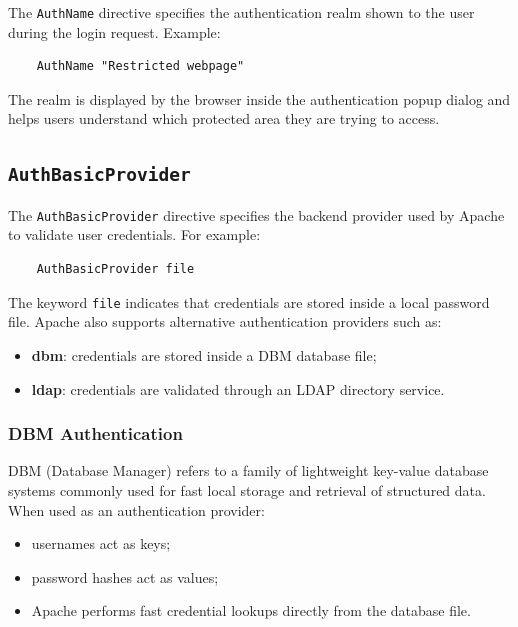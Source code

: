 \documentclass{scrbook}
\begin{document}
	The \texttt{AuthName} directive specifies the authentication realm shown to the user during the login request. Example:
	
	\begin{lstlisting}
	AuthName "Restricted webpage"
	\end{lstlisting}
	
	The realm is displayed by the browser inside the authentication popup dialog and helps users understand which protected area they are trying to access.
	
	\subsection{\texttt{AuthBasicProvider}}
	
	The \texttt{AuthBasicProvider} directive specifies the backend provider used by Apache to validate user credentials. For example:
	
	\begin{lstlisting}
	AuthBasicProvider file
	\end{lstlisting}
	
	The keyword \texttt{file} indicates that credentials are stored inside a local password file. Apache also supports alternative authentication providers such as:
	
	\begin{itemize}
		\item \textbf{dbm}: credentials are stored inside a DBM database file;
		
		\item \textbf{ldap}: credentials are validated through an LDAP directory service.
	\end{itemize}
	
	\subsubsection{DBM Authentication}
	
	DBM (Database Manager) refers to a family of lightweight key-value database systems commonly used for fast local storage and retrieval of structured data. When used as an authentication provider:
	\begin{itemize}
		\item usernames act as keys;
		
		\item password hashes act as values;
		
		\item Apache performs fast credential lookups directly from the database file.
	\end{itemize}
	
\end{document}
